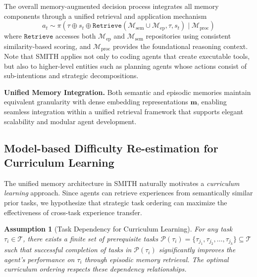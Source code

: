 \documentclass{article} %
\newtheorem{assumption}{Assumption}
\begin{document}
The overall memory-augmented decision process integrates all memory components through a unified retrieval and application mechanism
\begin{equation}
a_t \sim \pi(\tau \oplus s_t \oplus \texttt{Retrieve}(\mathcal{M}_{\text{sem}} \cup \mathcal{M}_{\text{ep}}, \tau, s_t) \mid \mathcal{M}_{\text{proc}})
\end{equation}
where $\texttt{Retrieve}$ accesses both $\mathcal{M}_{\text{ep}}$ and $\mathcal{M}_{\text{sem}}$ repositories using consistent similarity-based scoring, and $\mathcal{M}_{\text{proc}}$ provides the foundational reasoning context. Note that SMITH applies not only to coding agents that create executable tools, but also to higher-level entities such as planning agents whose actions consist of sub-intentions and strategic decompositions.

\textbf{Unified Memory Integration.} Both semantic and episodic memories maintain equivalent granularity with dense embedding representations $\mathbf{m}$, enabling seamless integration within a unified retrieval framework that supports elegant scalability and modular agent development.


\subsection{Model-based Difficulty Re-estimation for Curriculum Learning}
\label{curriculum}

The unified memory architecture in SMITH naturally motivates a \textit{curriculum learning} approach. Since agents can retrieve experiences from semantically similar prior tasks, we hypothesize that strategic task ordering can maximize the effectiveness of cross-task experience transfer.

\begin{assumption}[Task Dependency for Curriculum Learning]
\label{assumption2}
For any task $\tau_i \in \mathcal{T}$, there exists a finite set of prerequisite tasks $\mathcal{P}(\tau_i) = \{\tau_{j_1}, \tau_{j_2}, \ldots, \tau_{j_k}\} \subseteq \mathcal{T}$ such that successful completion of tasks in $\mathcal{P}(\tau_i)$ significantly improves the agent's performance on $\tau_i$ through episodic memory retrieval. The optimal curriculum ordering respects these dependency relationships.
\end{assumption}
\end{document}
